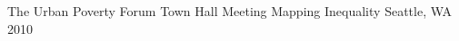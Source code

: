 \begin{cventries}
    
    
    
    
  \cventry
    {The Urban Poverty Forum Town Hall Meeting} %
    {Mapping Inequality} %
    {Seattle, WA} %
    {2010} %
    {}


\end{cventries}




